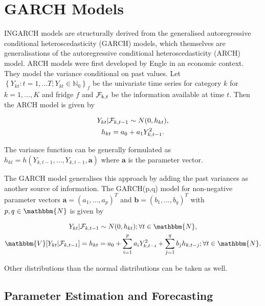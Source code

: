 
\section{GARCH Models}
\label{sec: Garch Models}

INGARCH models are structurally derived from the generalised autoregressive conditional heteroscedasticity (GARCH) models, which themselves are generalisations of the autoregressive conditional heteroscedasticity (ARCH) model. ARCH models were first developed by Engle \cite{Engle:1982} in an economic context. They model the variance conditional on past values. Let $\left\{Y_{kt}:t=1,\ldots T; Y_{kt} \in \mathbb{N}_0\right\}_f$ be the univariate time series for category $k$ for $k=1,\ldots,K$ and fridge $f$ and $\mathcal{F}_{k,t}$ be the information available at time $t$. Then the ARCH model is given by \cite{Engle:1982}

\begin{gather}
Y_{kt} | \mathcal{F}_{k,t-1} \sim N(0,h_{kt}),\\
h_{kt} = a_0 + a_1 Y_{k,t-1}^2.
\label{eq:ARCH model}
\end{gather}

The variance function can be generally formulated as $h_{kt} = h(Y_{k,t-1},\ldots,Y_{k,t-1},\bm{a})$ where $\bm{a}$ is the parameter vector. 

The GARCH model generalises this approach by adding the past variances as another source of information. The GARCH(p,q) model for non-negative parameter vectors $\bm{a}=(a_1,\ldots,a_p)^T$ and $\bm{b}=(b_1,\ldots,b_q)^T$ with $p,q \in \mathbbm{N}$ is given by \cite{Bollerslev:1986}

\begin{gather}
Y_{kt} | \SigA_{k,t-1} \sim N(0,h_{kt}); \forall t \in \mathbbm{N}, \\
\mathbbm{V}[Y_{kt}|\SigA_{k,t-1}]=h_{kt} = a_0 + \sum_{i=1}^p a_i Y_{k,t-i}^2 + \sum_{j=1}^q b_j h_{k,t-j};\forall t \in \mathbbm{N}.
\label{eq:GARCH model}
\end{gather}

Other distributions than the normal distributions can be taken as well. 

\subsection{Parameter Estimation and Forecasting}
\label{sec: GARCH Parameter Estimation and Forecasting}

